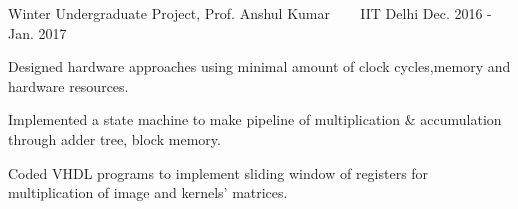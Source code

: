 \begin{cventries}
 \cventry
  {Winter Undergraduate Project, Prof. Anshul Kumar}
  {\href{https://drive.google.com/file/d/0B7I8cEc5HGiaaDZNNnJESV94T3FiaFp6elZBZEk5Wm9Ub19z/view?usp=sharing}{}
    \ \ \ \normalfont\href{https://drive.google.com/file/d/0B7I8cEc5HGiaaDZNNnJESV94T3FiaFp6elZBZEk5Wm9Ub19z/view?usp=sharing}
    {}}
  {IIT Delhi}
  {Dec. 2016 - Jan. 2017}
  {
    \begin{cvitems}
    \item Designed hardware approaches using minimal amount of clock cycles,memory and hardware resources.
    \item Implemented a state machine to make pipeline of multiplication \& accumulation through adder tree, block memory.
    \item Coded VHDL programs to implement sliding window of registers for multiplication of image and kernels' matrices.
    \end{cvitems}
  }

\end{cventries}

